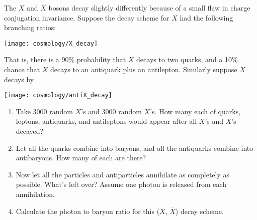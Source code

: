 \begin{problem}
The $X$ and $\overline X$ bosons decay slightly differently
  because of a small flaw in charge conjugation invariance.  Suppose
  the decay scheme for $X$ had the following branching ratios:
\begin{center}
\texttt{[image: cosmology/X\_decay]}
\end{center}
  That is, there is a 90\% probability that $X$ decays to two quarks,
  and a 10\% chance that $X$ decays to an antiquark plus an antilepton.
  Similarly suppose $\overline X$ decays by
\begin{center}
\texttt{[image: cosmology/antiX\_decay]}
\end{center}

  \begin{enumerate}
  \item Take 3000 random $X$'s and 3000 random $\overline X$'s.  How
    many each of quarks, leptons, antiquarks, and antileptons would
    appear after all $X$'s and $\overline X$'s decayed?
  \item Let all the quarks combine into baryons, and all the
    antiquarks combine into antibaryons.  How many of each are there?
  \item Now let all the particles and antiparticles annihilate as
    completely as possible.  What's left over?  Assume one photon is
    released from each annihilation.
  \item Calculate the photon to baryon ratio for this ($X$, $\overline
    X$) decay scheme.
  \end{enumerate}
  \label{prob:X_asymmetry}
\end{problem}



